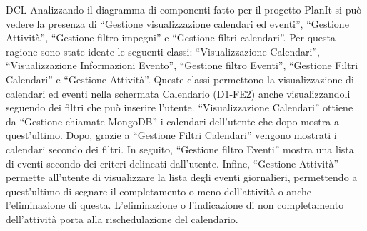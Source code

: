 \begin{listaPersonale}{DCL}
    Analizzando il diagramma di componenti fatto per il progetto PlanIt si può vedere la presenza di “Gestione visualizzazione calendari ed eventi”, “Gestione Attività”, “Gestione filtro impegni” e “Gestione filtri calendari”. Per questa ragione sono state ideate le seguenti classi: “Visualizzazione Calendari”,  “Visualizzazione Informazioni Evento”, “Gestione filtro Eventi”, “Gestione Filtri Calendari” e “Gestione Attività”. Queste classi permettono la visualizzazione di calendari ed eventi nella schermata Calendario (D1-FE2) anche visualizzandoli seguendo dei filtri che può inserire l'utente.
    “Visualizzazione Calendari” ottiene da “Gestione chiamate MongoDB” i calendari dell'utente che dopo mostra a quest'ultimo. Dopo, grazie a “Gestione Filtri Calendari” vengono mostrati i calendari secondo dei filtri.
    In seguito, “Gestione filtro Eventi” mostra una lista di eventi secondo dei criteri delineati dall'utente.
    Infine, “Gestione Attività”  permette all'utente di visualizzare la lista degli eventi giornalieri, permettendo a quest'ultimo di segnare il completamento o meno dell'attività o anche l'eliminazione di questa. L'eliminazione o l'indicazione di non completamento dell'attività porta alla rischedulazione del calendario.
    \begin{comment}
        \begin{center}
            \\
            \blfootnote{Immagine \href{https://github.com/Life-planner/Documentazione/blob/main/D3/img/Diagrammi/png/path/to/img.png}{PNG}/\href{https://github.com/Life-planner/Documentazione/blob/main/D3/img/Diagrammi/svg/path/to/img.svg}{SVG} nome file}
        \end{center}
    \end{comment}



\end{listaPersonale}
